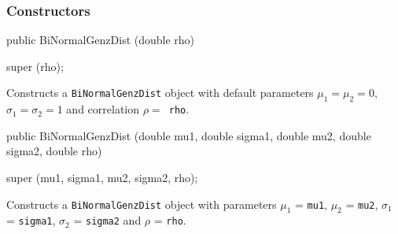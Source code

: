 \subsubsection* {Constructors}

\begin{code}

   public BiNormalGenzDist (double rho) \begin{hide} {
       super (rho);
   }\end{hide}
\end{code}
\begin{tabb}
 Constructs a \texttt{BiNormalGenzDist} object with default  parameters
 $\mu_1 = \mu_2 = 0$, $\sigma_1 = \sigma_2 = 1$ and correlation
 $\rho = $\texttt{ rho}.
  \end{tabb}
\begin{code}

   public BiNormalGenzDist (double mu1, double sigma1,
                            double mu2, double sigma2, double rho) \begin{hide} {
      super (mu1, sigma1, mu2, sigma2, rho);
   }\end{hide}
\end{code}
\begin{tabb}
 Constructs a \texttt{BiNormalGenzDist} object with parameters $\mu_1$ = \texttt{mu1},
 $\mu_2$ = \texttt{mu2}, $\sigma_1$ = \texttt{sigma1},  $\sigma_2$ = \texttt{sigma2}
 and $\rho$ = \texttt{rho}.
  \end{tabb}

